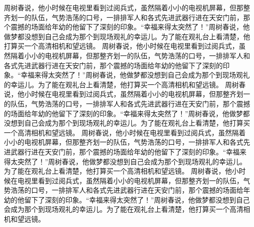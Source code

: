 周树春说，他小时候在电视里看到过阅兵式，虽然隔着小小的电视机屏幕，但那整齐划一的队伍，气势浩荡的口号，一排排军人和各式先进武器行进在天安门前，那个震撼的场面给年幼的他留下了深刻的印象。“幸福来得太突然了！”周树春说，他做梦都没想到自己会成为那个到现场观礼的幸运儿。为了能在观礼台上看清楚，他打算买一个高清相机和望远镜。
周树春说，他小时候在电视里看到过阅兵式，虽然隔着小小的电视机屏幕，但那整齐划一的队伍，气势浩荡的口号，一排排军人和各式先进武器行进在天安门前，那个震撼的场面给年幼的他留下了深刻的印象。“幸福来得太突然了！”周树春说，他做梦都没想到自己会成为那个到现场观礼的幸运儿。为了能在观礼台上看清楚，他打算买一个高清相机和望远镜。
周树春说，他小时候在电视里看到过阅兵式，虽然隔着小小的电视机屏幕，但那整齐划一的队伍，气势浩荡的口号，一排排军人和各式先进武器行进在天安门前，那个震撼的场面给年幼的他留下了深刻的印象。“幸福来得太突然了！”周树春说，他做梦都没想到自己会成为那个到现场观礼的幸运儿。为了能在观礼台上看清楚，他打算买一个高清相机和望远镜。
周树春说，他小时候在电视里看到过阅兵式，虽然隔着小小的电视机屏幕，但那整齐划一的队伍，气势浩荡的口号，一排排军人和各式先进武器行进在天安门前，那个震撼的场面给年幼的他留下了深刻的印象。“幸福来得太突然了！”周树春说，他做梦都没想到自己会成为那个到现场观礼的幸运儿。为了能在观礼台上看清楚，他打算买一个高清相机和望远镜。
周树春说，他小时候在电视里看到过阅兵式，虽然隔着小小的电视机屏幕，但那整齐划一的队伍，气势浩荡的口号，一排排军人和各式先进武器行进在天安门前，那个震撼的场面给年幼的他留下了深刻的印象。“幸福来得太突然了！”周树春说，他做梦都没想到自己会成为那个到现场观礼的幸运儿。为了能在观礼台上看清楚，他打算买一个高清相机和望远镜。


